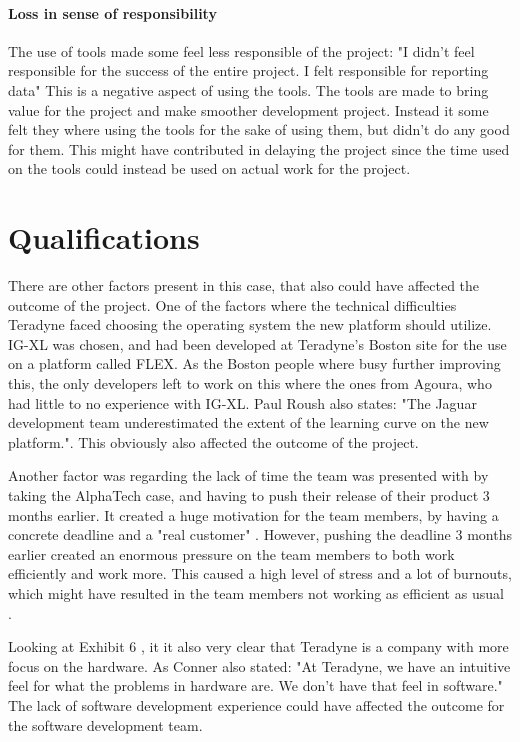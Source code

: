 \paragraph{Loss in sense of responsibility} The use of tools made some feel less responsible of the project: "I didn't feel responsible for the success of the entire project. I felt responsible for reporting data" \cite[p. 12]{GinoPisano2005}
This is a negative aspect of using the tools. The tools are made to bring value for the project and make smoother development project. Instead it some felt they where using the tools for the sake of using them, but didn't do any good for them. This might have contributed in delaying the project since the time used on the tools could instead be used on actual work for the project.

\section{Qualifications}

There are other factors present in this case, that also could have affected the outcome of the project.
One of the factors where the technical difficulties Teradyne faced choosing the operating system the new platform should utilize. IG-XL was chosen, and had been developed at Teradyne's Boston site for the use on a platform called FLEX. As the Boston people where busy further improving this, the only developers left to work on this where the ones from Agoura, who had little to no experience with IG-XL. Paul Roush also states: "The Jaguar development team underestimated the extent of the learning curve on the new platform."\cite[p. 9]{GinoPisano2005}. This obviously also affected the outcome of the project.

Another factor was regarding the lack of time the team was presented with by taking the AlphaTech case, and having to push their release of their product 3 months earlier. It created a huge motivation for the team members, by having a concrete deadline and a "real customer" \cite[p. 10]{GinoPisano2005}. However, pushing the deadline 3 months earlier created an enormous pressure on the team members to both work efficiently and work more. This caused a high level of stress and a lot of burnouts, which might have resulted in the team members not working as efficient as usual \cite[p. 10]{GinoPisano2005}. 

Looking at Exhibit 6 \cite[p. 20]{GinoPisano2005}, it it also very clear that Teradyne is a company with more focus on the hardware. As Conner also stated: "At Teradyne, we have an intuitive feel for what the problems in hardware are. We don't have that feel in software."\cite[p. 10]{GinoPisano2005} The lack of software development experience could have affected the outcome for the software development team. 